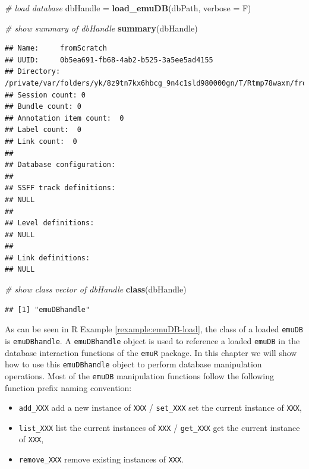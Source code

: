 \documentclass[]{book}
\newenvironment{Shaded}{\begin{snugshade}}{\end{snugshade}}
\newcommand{\CommentTok}[1]{\textcolor[rgb]{0.56,0.35,0.01}{\textit{#1}}}
\newcommand{\DataTypeTok}[1]{\textcolor[rgb]{0.13,0.29,0.53}{#1}}
\newcommand{\KeywordTok}[1]{\textcolor[rgb]{0.13,0.29,0.53}{\textbf{#1}}}
\newcommand{\NormalTok}[1]{#1}
\newcommand{\StringTok}[1]{\textcolor[rgb]{0.31,0.60,0.02}{#1}}
\providecommand{\tightlist}{%
  \setlength{\itemsep}{0pt}\setlength{\parskip}{0pt}}
\theoremstyle{definition}
\theoremstyle{definition}
\theoremstyle{definition}
\theoremstyle{remark}
\begin{document}
\begin{Shaded}
\begin{Highlighting}[]
\CommentTok{# load database}
\NormalTok{dbHandle =}\StringTok{ }\KeywordTok{load_emuDB}\NormalTok{(dbPath, }\DataTypeTok{verbose =}\NormalTok{ F)}

\CommentTok{# show summary of dbHandle}
\KeywordTok{summary}\NormalTok{(dbHandle)}
\end{Highlighting}
\end{Shaded}

\begin{verbatim}
## Name:     fromScratch 
## UUID:     0b5ea691-fb68-4ab2-b525-3a5ee5ad4155 
## Directory:    /private/var/folders/yk/8z9tn7kx6hbcg_9n4c1sld980000gn/T/Rtmp78waxm/fromScratch_emuDB 
## Session count: 0 
## Bundle count: 0 
## Annotation item count:  0 
## Label count:  0 
## Link count:  0 
## 
## Database configuration:
## 
## SSFF track definitions:
## NULL
## 
## Level definitions:
## NULL
## 
## Link definitions:
## NULL
\end{verbatim}

\begin{Shaded}
\begin{Highlighting}[]
\CommentTok{# show class vector of dbHandle}
\KeywordTok{class}\NormalTok{(dbHandle)}
\end{Highlighting}
\end{Shaded}

\begin{verbatim}
## [1] "emuDBhandle"
\end{verbatim}

As can be seen in R Example \ref{rexample:emuDB-load}, the class of a
loaded \texttt{emuDB} is \texttt{emuDBhandle}. A \texttt{emuDBhandle}
object is used to reference a loaded \texttt{emuDB} in the database
interaction functions of the \texttt{emuR} package. In this chapter we
will show how to use this \texttt{emuDBhandle} object to perform
database manipulation operations. Most of the \texttt{emuDB}
manipulation functions follow the following function prefix naming
convention:

\begin{itemize}
\tightlist
\item
  \texttt{add\_XXX} add a new instance of \texttt{XXX} /
  \texttt{set\_XXX} set the current instance of \texttt{XXX},
\item
  \texttt{list\_XXX} list the current instances of \texttt{XXX} /
  \texttt{get\_XXX} get the current instance of \texttt{XXX},
\item
  \texttt{remove\_XXX} remove existing instances of \texttt{XXX}.
\end{itemize}
\end{document}
